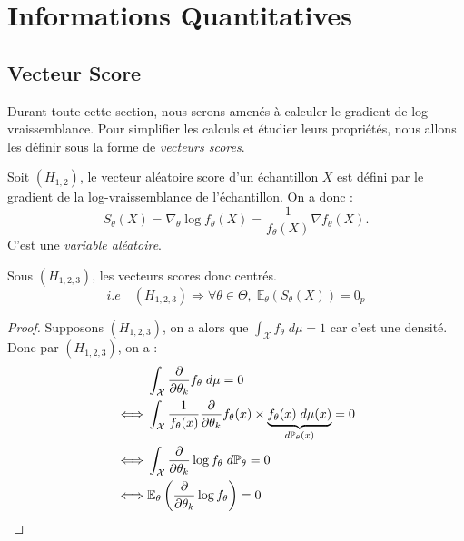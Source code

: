 
\section{Informations Quantitatives}

\subsection{Vecteur Score}

Durant toute cette section, nous serons amenés à calculer le gradient de log-vraissemblance. 
Pour simplifier les calculs et étudier leurs propriétés, nous allons les définir sous 
la forme de \emph{vecteurs scores}. 

\begin{definition}
    Soit $(H_{1,2})$, le vecteur aléatoire score d'un échantillon $X$ est défini par le gradient de la 
    log-vraissemblance de l'échantillon. On a donc : 
    \begin{equation}
        \boxed{S_\theta(X) = \nabla_\theta \log f_\theta(X) = \frac{1}{f_\theta(X)} \nabla f_\theta(X). }
    \end{equation}
    C'est une \emph{variable aléatoire}. 
\end{definition}

\begin{prop}[Espérance]
    Sous $(H_{1, 2, 3})$, les vecteurs scores donc centrés. 
        $$ i.e \quad (H_{1, 2, 3}) \Longrightarrow \forall \theta \in \Theta, \; \mathbb{E}_\theta(S_\theta(X)) = 0_p $$
\end{prop}

\begin{proof}
    Supposons $(H_{1, 2, 3})$, on a alors que $ \int_\mathcal{X} f_\theta \; d \mu = 1$ car c'est une densité. 
    Donc par $(H_{1, 2, 3})$, on a : 
        \begin{align*}
            & \int_\mathcal{X} \frac{ \partial}{ \partial \theta_k} f_\theta \; d \mu = 0 \\ 
            \iff & \int_\mathcal{X} \frac{1}{f_\theta(x)} \frac{\partial}{\partial \theta_k} f_\theta(x) \times 
                \underbrace{ f_\theta(x) \; d \mu(x)}_{d \mathbb{P}_\theta(x)} = 0 \\ 
            \iff & \int_\mathcal{X} \frac{ \partial }{\partial \theta_k} \log f_\theta \; d \mathbb{P}_\theta = 0 \\ 
            \iff & \mathbb{E}_\theta \left( \frac{\partial}{\partial \theta_k} \log f_\theta \right) = 0 
        \end{align*}
\end{proof}

